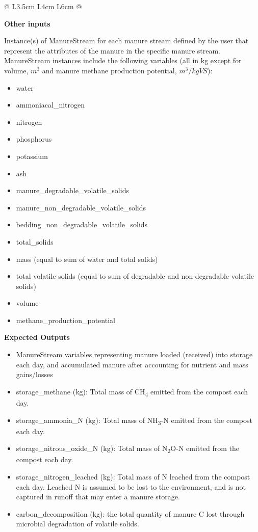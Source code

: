 \begin{refsection}
\begin{table}[h!]
\begin{tabular}{@{} L{3.5cm} L{4cm} L{6cm} @{}}
    \bottomrule
    \end{tabular}
    \end{table}  
    \vspace{0.5cm}
    
\textbf{Other inputs}
\vspace{ 0.25cm}

Instance(s) of ManureStream for each manure stream defined by the user that represent the attributes of the manure in the specific manure stream. ManureStream instances include the following variables (all in kg except for volume, \(m^3\) and manure methane production potential, \(m^3 / kgVS\)):
    \begin{itemize}
        \item water 
        \item ammoniacal\_nitrogen
        \item nitrogen 
        \item phosphorus
        \item potassium
        \item ash
        \item manure\_degradable\_volatile\_solids
        \item manure\_non\_degradable\_volatile\_solids
        \item bedding\_non\_degradable\_volatile\_solids
        \item total\_solids
        \item mass (equal to sum of water and total solids)
        \item total volatile solids (equal to sum of degradable and non-degradable volatile solids)
        \item volume
        \item methane\_production\_potential
\end{itemize}
\vspace{0.2cm}


\textbf{Expected Outputs}

\begin{itemize}
    \item ManureStream variables representing manure loaded (received) into storage each day, and accumulated manure after accounting for nutrient and mass gains/losses
    \item storage\_methane (kg): Total mass of CH\textsubscript{4} emitted from the compost each day.
    \item storage\_ammonia\_N (kg): Total mass of NH\textsubscript{3}-N emitted from the compost each day.
    \item storage\_nitrous\_oxide\_N (kg): Total mass of N\textsubscript{2}O-N emitted from the compost each day.
    \item storage\_nitrogen\_leached (kg): Total mass of N leached from the compost each day. Leached N is assumed to be lost to the environment, and is not captured in runoff that may enter a manure storage.
    \item carbon\_decomposition (kg): the total quantity of manure C lost through microbial degradation of volatile solids. 



\end{itemize}
\end{refsection}
